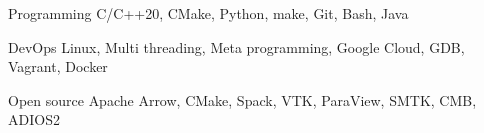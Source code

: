 

\begin{cvskills}
  \cvskill
    {Programming} %
    {C/C++20, CMake, Python, make, Git, Bash, Java} %

  \cvskill
    {DevOps} %
    {Linux, Multi threading, Meta programming, Google Cloud, GDB, Vagrant, Docker} %



  \cvskill
    {Open source} %
    {Apache Arrow, CMake, Spack, VTK, ParaView, SMTK, CMB, ADIOS2} %

\end{cvskills}
